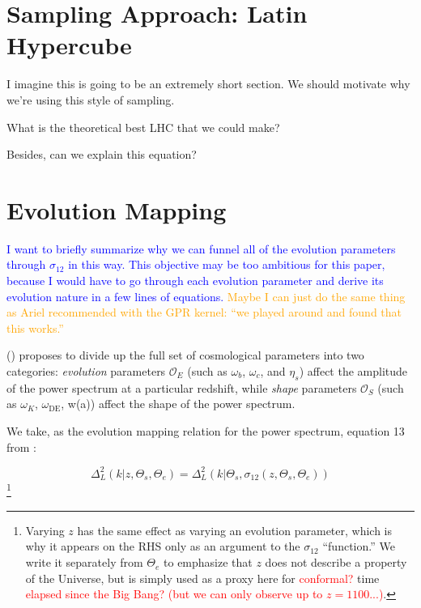 \section{Sampling Approach: Latin Hypercube}
\label{sec: lhc_theory}

I imagine this is going to be an extremely short section. We should motivate why we're using this style of sampling.

What is the theoretical best LHC that we could make?

Besides, can we explain this equation?


\section{Evolution Mapping}
\label{sec: ev_mapping_intro}

\textcolor{blue}{I want to briefly summarize why we can funnel all of the 
evolution parameters through $\sigma_{12}$ in this way. This objective may be
too ambitious for this paper, because I would have to go through each
evolution parameter and derive its evolution nature in a few lines of 
equations.} \textcolor{orange}{Maybe I can just do the same thing as Ariel
recommended with the GPR kernel: ``we played around and found that this
works.''}

() proposes to divide up the full set of cosmological
parameters into two categories: \textit{evolution} parameters $\mathcal{O}_E$
(such as $\omega_b$, $\omega_c$, and $\eta_s$)
affect the amplitude of the power spectrum at a particular redshift, while
\textit{shape} parameters $\mathcal{O}_S$
(such as $\omega_K$, $\omega_\text{DE}$, w(a))
affect the shape of the power
spectrum.

We take, as the evolution mapping relation for the power spectrum, equation 13
from :

\begin{equation}
\label{eq: evMapping_pSpectrum}
    \Delta^2_L (k | z, \Theta_s, \Theta_e)
    =
    \Delta_L^2 (k | \Theta_s, \sigma_{12} \left( z, \Theta_s, \Theta_e \right))
\end{equation}\footnote{Varying $z$ has the same effect as varying an
evolution parameter, which is why it appears on the RHS only as an argument to
the $\sigma_{12}$ ``function.'' We write it separately from $\Theta_e$ to
emphasize that $z$ does not describe a property of the Universe, but is
simply used as a proxy here for \textcolor{red}{conformal?} time
\textcolor{red}{elapsed since the Big Bang? (but we can only observe up to
$z = 1100$...)}.}

